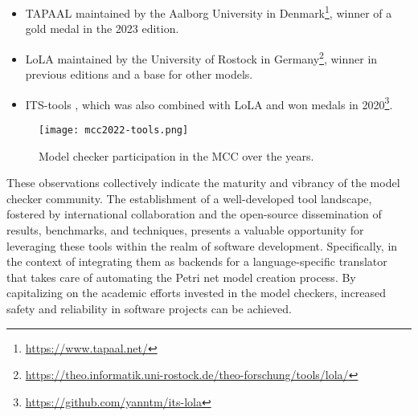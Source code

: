 \begin{itemize}
  \item \acrfull{TAPAAL} maintained by the Aalborg University
        in Denmark\footnote{\url{https://www.tapaal.net/}},
        winner of a gold medal in the 2023 edition.
  \item \acrfull{LoLA} maintained by the University of Rostock
        in Germany\footnote{\url{https://theo.informatik.uni-rostock.de/theo-forschung/tools/lola/}},
        winner in previous editions and a base for other models.
  \item ITS-tools \cite{thierrymieg:hal-02104373},
        which was also combined with \acrshort{LoLA} and won medals
        in 2020\footnote{\url{https://github.com/yanntm/its-lola}}.
\end{itemize}

\begin{figure}[!htb]
  \centering
  \texttt{[image: mcc2022-tools.png]}
  \caption{Model checker participation in the MCC over the years.}
  \label{fig:mcc2022-tools}
\end{figure}

These observations collectively indicate
the maturity and vibrancy of the model checker community.
The establishment of a well-developed tool landscape,
fostered by international collaboration and the open-source dissemination of results, benchmarks, and techniques,
presents a valuable opportunity for leveraging these tools within the realm of software development.
Specifically, in the context of integrating them as backends for a language-specific translator
that takes care of automating the Petri net model creation process.
By capitalizing on the academic efforts invested in the model checkers,
increased safety and reliability in software projects can be achieved.
